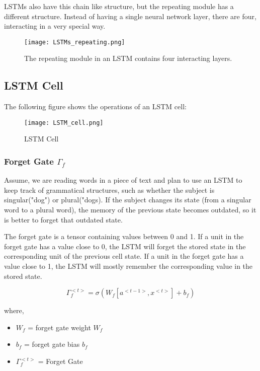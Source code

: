 LSTMs also have this chain like structure, but the repeating module has a different structure. Instead of having a single neural network layer, there are four, interacting in a very special way.


\begin{figure}[H]
    \centering
    \texttt{[image: LSTMs\_repeating.png]}
    \caption{The repeating module in an LSTM contains four interacting layers.}
    \label{fig:LSTMs_repeating}
\end{figure}

\subsection{LSTM Cell}
The following figure shows the operations of an LSTM cell:
\begin{figure}[H]
    \centering
    \texttt{[image: LSTM\_cell.png]}
    \caption{LSTM Cell}
    \label{fig:LSTMs_cell}
\end{figure}

\subsubsection{Forget Gate $\Gamma _f$}
Assume, we are reading words in a piece of text and plan to use an LSTM to keep track of grammatical structures, such as whether the subject is singular("dog") or plural("dogs). If the subject changes its state (from a singular word to a plural word), the memory of the previous state becomes outdated, so it is better to forget that outdated state.

The forget gate is a tensor containing values between 0 and 1. If a unit in the forget gate has a value close to 0, the LSTM will forget the stored state in the corresponding unit of the previous cell state. If a unit in the forget gate has a value close to 1, the LSTM will mostly remember the corresponding value in the stored state.

\begin{equation}
    \Gamma _f ^{<t>} = \sigma (W_f[a^{<t - 1>}, x^{<t>}] + b_f)
\end{equation}

where,
\begin{itemize}
    \item $W_f$ = forget gate weight $W_f$
    \item $b_f$ = forget gate bias $b_f$
    \item $\Gamma _f ^ {<t>}$ = Forget Gate
\end{itemize}

